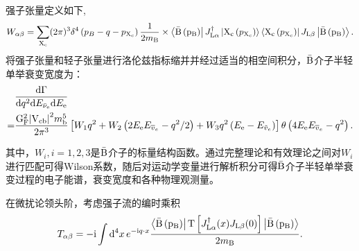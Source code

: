 强子张量定义如下, 
\begin{equation}
    W_{\alpha \beta}=\sum_{\mathrm{X_c}}(2 \pi)^3 \delta^4\left(p_B-q-p_{\mathrm{X_c}}\right) \frac{1}{2m_{\mathrm{B}}} \times\left\langle\mathrm{\bar{B}\left(p_B\right)}\right| J_{\mathrm{L} \alpha}^{\dagger}\left|\mathrm{X_c}\left(p_{\mathrm{X_c}}\right)\right\rangle\left\langle\mathrm{X_c}\left(p_{\mathrm{X_c}}\right)\right| J_{\mathrm{L} \beta}\left|\mathrm{\bar{B}\left(p_B\right)}\right\rangle.
    \end{equation}
将强子张量和轻子张量进行洛伦兹指标缩并并经过适当的相空间积分，$\mathrm{\bar{B}}$介子半轻单举衰变宽度为：
\begin{equation}
    \begin{aligned}
    & \frac{\mathrm{d} \Gamma}{\mathrm{d} q^2 \mathrm{d} E_{\mathrm{\bar{\nu}_e}} \mathrm{d} E_{\mathrm{e}}} \\
    = & \frac{\mathrm{G_F^2} \mathrm{\left| V_{\mathrm{cb}} \right|^2} m_{\mathrm{b}}^5}{2 \pi^3} \left[ W_1 q^2 + W_2 \left( 2 E_{\mathrm{e}} E_{\overline{v}_e} - q^2 / 2 \right) + W_3 q^2 \left( E_{\mathrm{e}} - E_{\tilde{v}_e} \right) \right] \theta \left( 4 E_{\mathrm{e}} E_{\overline{v}_e} - q^2 \right).
    \end{aligned}
\end{equation}

其中，$W_{i}, i=1,2,3$是$\mathrm{\bar{B}}$介子的标量结构函数。通过完整理论和有效理论之间对$W_{i}$进行匹配可得Wilson系数，随后对运动学变量进行解析积分可得$\mathrm{\bar{B}}$介子半轻单举衰变过程的电子能谱，衰变宽度和各种物理观测量。

在微扰论领头阶，考虑强子流的编时乘积
\begin{equation}
    T_{\alpha \beta} = -\mathrm{i} \int \mathrm{d}^4 x \, e^{-\mathrm{i} q \cdot x} \frac{\left\langle \mathrm{\bar{B}} \left( {\mathrm{p_B}} \right) \right| \operatorname{T} \left[ J_{\mathrm{L} \alpha}^{\dagger} (x) J_{\mathrm{L}\beta} (0) \right] \left| \mathrm{\bar{B}} \left( \mathrm{p_{B}} \right) \right\rangle}{2 m_{\mathrm{B}}}.
\end{equation}

